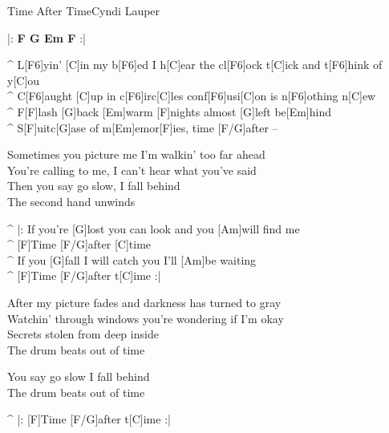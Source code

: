 \begin{song}{Time After Time}{Cyndi Lauper}

\begin{guitar}
|: \textbf{F   G   Em   F} :|\\
\end{guitar}

\begin{guitar}
^ L[F6]yin' [C]in my b[F6]ed I h[C]ear the cl[F6]ock t[C]ick and t[F6]hink of y[C]ou\\
^ C[F6]aught [C]up in c[F6]irc[C]les conf[F6]usi[C]on is n[F6]othing n[C]ew\\
^ F[F]lash [G]back [Em]warm [F]nights almost [G]left be[Em]hind\\
^ S[F]uitc[G]ase of m[Em]emor[F]ies, time [F/G]after –\\
\end{guitar}

\begin{guitar}
Sometimes you picture me I'm walkin' too far ahead\\
You're calling to me, I can't hear what you've said\\
Then you say go slow, I fall behind\\
The second hand unwinds\\
\end{guitar}

\begin{guitar}
^ |: If you're [G]lost you can look and you [Am]will find me\\
^ [F]Time [F/G]after [C]time\\
^ If you [G]fall I will catch you I'll [Am]be waiting\\
^ [F]Time [F/G]after t[C]ime :|\\
\end{guitar}


\begin{guitar}
After my picture fades and darkness has turned to gray\\
Watchin' through windows you're wondering if I'm okay\\
Secrets stolen from deep inside\\
The drum beats out of time\\
\end{guitar}



\begin{guitar}
You say go slow I fall behind\\
The drum beats out of time\\
\end{guitar}


\begin{guitar}
^ |: [F]Time [F/G]after t[C]ime :|\\
\end{guitar}
\end{song}
